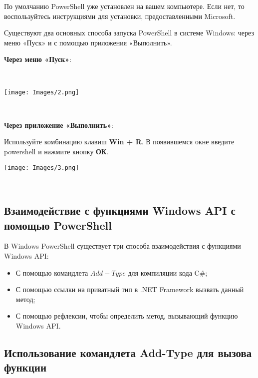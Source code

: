 \documentclass[12pt, a4paper, twoside]{article}
\begin{document}
По умолчанию PowerShell уже установлен на вашем компьютере. 
Если нет, то воспользуйтесь инструкциями для установки, предоставленными Microsoft.   

Существуют два основных способа запуска PowerShell в системе Windows: 
через меню «Пуск» и с помощью приложения «Выполнить».\\

\begin{flushleft}
    \textbf{Через меню «Пуск»}:
\end{flushleft}\\

\begin{center}
\texttt{[image: Images/2.png]}
\end{center}\\

\newpage
\begin{flushleft}
    \textbf{Через приложение «Выполнить»}:
\end{flushleft}

Используйте комбинацию клавиш \textbf{Win + R}. В появившемся окне введите powershell и нажмите кнопку \textbf{ОК}.\\

\begin{center}
\texttt{[image: Images/3.png]}
\end{center}\\

\begin{center}
\subsection{Взаимодействие с функциями Windows API с помощью PowerShell}
\end{center}

В Windows PowerShell существует три способа взаимодействия с функциями Windows API:\\
\begin{itemize}
    \item С помощью командлета \(Add-Type\) для компиляции кода C\#;
    \item С помощью ссылки на приватный тип в .NET Framework вызвать данный метод;
    \item С помощью рефлексии, чтобы определить метод, вызывающий функцию Windows API.
\end{itemize}

\begin{center}
\subsection{Использование командлета Add-Type для вызова функции}
\end{center} 
\end{document}
